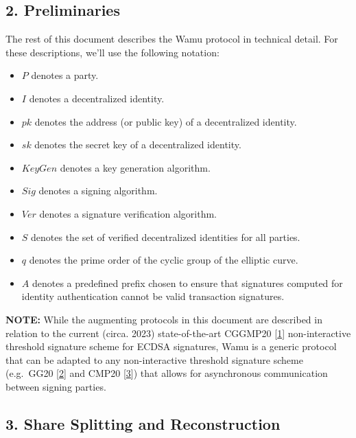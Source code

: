 \documentclass[
]{article}
\providecommand{\tightlist}{%
  \setlength{\itemsep}{0pt}\setlength{\parskip}{0pt}}
\begin{document}
\hypertarget{preliminaries}{%
\subsection{2. Preliminaries}\label{preliminaries}}

The rest of this document describes the Wamu protocol in technical
detail. For these descriptions, we'll use the following notation:

\begin{itemize}
\tightlist
\item
  \(P\) denotes a party.
\item
  \(I\) denotes a decentralized identity.
\item
  \(pk\) denotes the address (or public key) of a decentralized
  identity.
\item
  \(sk\) denotes the secret key of a decentralized identity.
\item
  \(KeyGen\) denotes a key generation algorithm.
\item
  \(Sig\) denotes a signing algorithm.
\item
  \(Ver\) denotes a signature verification algorithm.
\item
  \(S\) denotes the set of verified decentralized identities for all
  parties.
\item
  \(q\) denotes the prime order of the cyclic group of the elliptic
  curve.
\item
  \(A\) denotes a predefined prefix chosen to ensure that signatures
  computed for identity authentication cannot be valid transaction
  signatures.
\end{itemize}

\textbf{NOTE:} While the augmenting protocols in this document are
described in relation to the current (circa. 2023) state-of-the-art
CGGMP20 {[}\protect\hyperlink{ref-cggmp20}{1}{]} non-interactive
threshold signature scheme for ECDSA signatures, Wamu is a generic
protocol that can be adapted to any non-interactive threshold signature
scheme (e.g.~GG20 {[}\protect\hyperlink{ref-gg20}{2}{]} and CMP20
{[}\protect\hyperlink{ref-cmp20}{3}{]}) that allows for asynchronous
communication between signing parties.

\hypertarget{share-splitting-and-reconstruction}{%
\subsection{3. Share Splitting and
Reconstruction}\label{share-splitting-and-reconstruction}}
\end{document}
